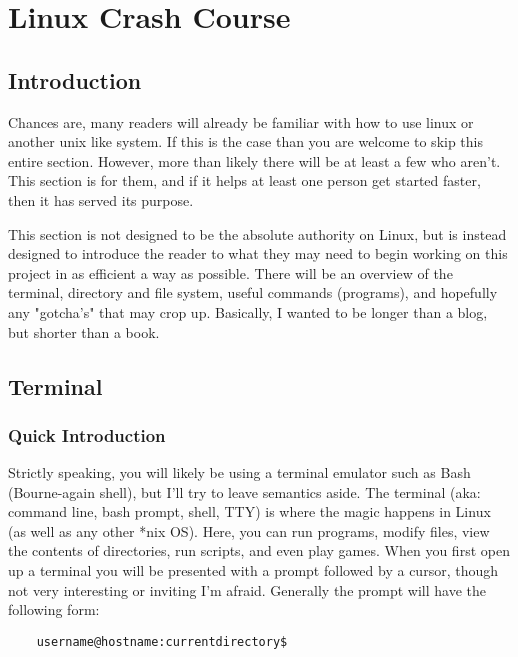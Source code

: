 \section{Linux Crash Course} \mdseries 


\subsection{Introduction} \mdseries 
Chances are, many readers will already be familiar with how to use linux or another unix like system.  If this is the case than you are welcome to skip this entire section. However, more than likely there will be at least a few who aren't.  This section is for them, and if it helps at least one person get started faster, then it has served its purpose.

This section is not designed to be the absolute authority on Linux, but is instead designed to introduce the reader to what they may need to begin working on this project in as efficient a way as possible.  There will be an overview of the terminal, directory and file system, useful commands (programs), and hopefully any "gotcha's" that may crop up.  Basically, I wanted to be longer than a blog, but shorter than a book.
	

\subsection{Terminal}
\subsubsection{Quick Introduction} \mdseries
Strictly speaking, you will likely be using a terminal emulator such as Bash (Bourne-again shell), but I'll try to leave semantics aside.  The terminal (aka: command line, bash prompt, shell, TTY) is where the magic happens in Linux (as well as any other *nix OS).  Here, you can run programs, modify files, view the contents of directories, run scripts, and even play games.  When you first open up a terminal you will be presented with a prompt followed by a cursor, though not very interesting or inviting I'm afraid.  Generally the prompt will have the following form:
	
	\begin{lstlisting}
	username@hostname:currentdirectory$
	\end{lstlisting}
	
